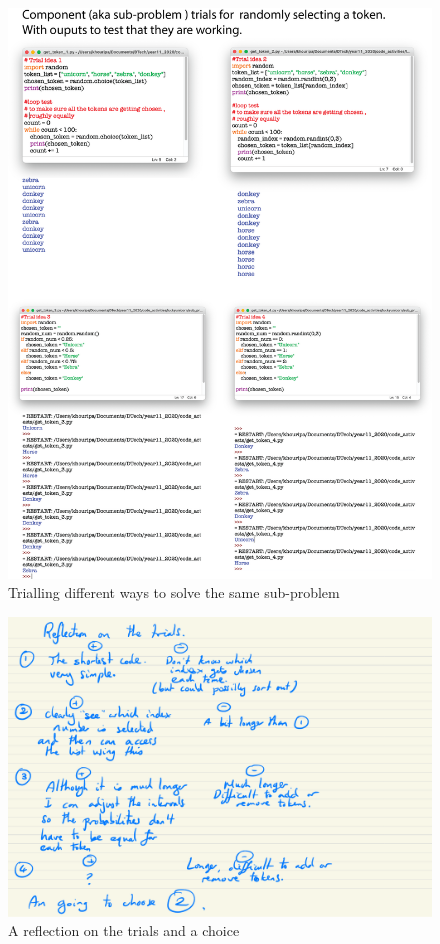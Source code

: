 \documentclass[a4paper,12pt]{article}
\begin{document}
\begin{figure} [!h]
	\centering
	\includegraphics[width=17cm]{iterative_processes/sub_problem_trials.png}
	\caption*{Trialling different ways to solve the same sub-problem}
\end{figure}

\newpage

\begin{figure} [!h]
	\centering
	\includegraphics[width=15cm]{iterative_processes/Lucky_Unicorn_Sub_problems_2_a.pdf}
	\caption*{A reflection on the trials and a choice}
\end{figure}
\end{document}

